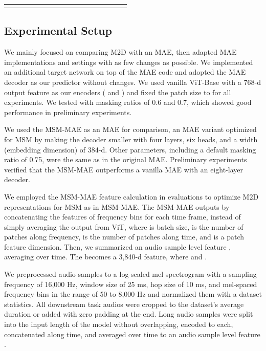 \documentclass{article}
\begin{document}
\begin{table*}[htb!]
{\begin{tabular}{lllllllllllllll}
\bottomrule
\addlinespace[0.05cm]
\end{tabular}
}
\vspace{-15pt}
\end{table*}




\subsection{Experimental Setup}
We mainly focused on comparing M2D with an MAE, then adapted MAE implementations and settings with as few changes as possible. We implemented an additional target network on top of the MAE code and adopted the MAE decoder as our predictor  without changes.
We used vanilla ViT-Base\cite{ViT} with a 768-d output feature as our encoders ( and ) and fixed the patch size to  for all experiments.
We tested with masking ratios of 0.6 and 0.7, which showed good performance in preliminary experiments.

We used the MSM-MAE\cite{niizumi2022msm-mae} as an MAE for comparison, an MAE variant optimized for MSM by making the decoder smaller with four layers, six heads, and a width (embedding dimension) of 384-d. Other parameters, including a default masking ratio of 0.75, were the same as in the original MAE.
Preliminary experiments verified that the MSM-MAE outperforms a vanilla MAE with an eight-layer decoder.

We employed the MSM-MAE feature calculation in evaluations to optimize M2D representations for MSM as in MSM-MAE.
The MSM-MAE outputs  by concatenating the features of frequency bins for each time frame, instead of simply averaging the  output from ViT, where  is batch size,  is the number of patches along frequency,  is the number of patches along time, and  is a patch feature dimension. Then, we summarized an audio sample level feature , averaging  over time. The  becomes a 3,840-d feature, where  and .

We preprocessed audio samples to a log-scaled mel spectrogram with a sampling frequency of 16,000 Hz, window size of 25 ms, hop size of 10 ms, and mel-spaced frequency bins  in the range of 50 to 8,000 Hz and normalized them with a dataset statistics.
All downstream task audios were cropped to the dataset's average duration or added with zero padding at the end.
Long audio samples were split into the input length of the model without overlapping, encoded to  each, concatenated along time, and averaged over time to an audio sample level feature .
\end{document}

